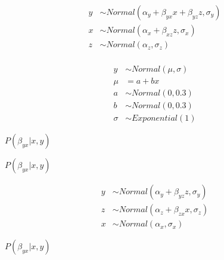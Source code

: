 \documentclass[10pt]{book}
\begin{document}
\begin{mdSnippets}
\begin{mdDisplaySnippet}[16625ecfe56933806e1118b2d6ea07aa]%
\[%
\begin{aligned} 
y &\sim Normal(\alpha_y + \beta_{yx}x + \beta_{yz}z, \sigma_y) \\
x &\sim Normal(\alpha_x + \beta_{xz}z, \sigma_x) \\
z &\sim Normal(\alpha_z, \sigma_z) \\
\end{aligned}
\]%
\end{mdDisplaySnippet}%
\begin{mdDisplaySnippet}%
\[%
\begin{aligned} 
y &\sim Normal(\mu, \sigma) \\
\mu &= a + bx \\ 
a &\sim Normal(0, 0.3) \\
b &\sim Normal(0, 0.3) \\
\sigma  &\sim Exponential(1)
\end{aligned}
\]%
\end{mdDisplaySnippet}%
\begin{mdInlineSnippet}[6f1aa4adb6f08434c5a5404ae8a42c8a]%
{$P(\beta_{yx}|x, y)$}\end{mdInlineSnippet}%
\begin{mdInlineSnippet}[6f1aa4adb6f08434c5a5404ae8a42c8a]%
{$P(\beta_{yx}|x, y)$}\end{mdInlineSnippet}%
\begin{mdDisplaySnippet}[1b202cf3b3b92dd8de473b30b24137bd]%
\[%
\begin{aligned} 
y &\sim Normal(\alpha_y + \beta_{yz}z, \sigma_y) \\
z &\sim Normal(\alpha_z + \beta_{zx}x, \sigma_z) \\
x &\sim Normal(\alpha_x, \sigma_x) 
\end{aligned}
\]%
\end{mdDisplaySnippet}%
\begin{mdInlineSnippet}[6f1aa4adb6f08434c5a5404ae8a42c8a]%
{$P(\beta_{yx}|x, y)$}\end{mdInlineSnippet}%
\begin{mdDisplaySnippet}%

\end{mdDisplaySnippet}
\end{mdSnippets}
\end{document}

